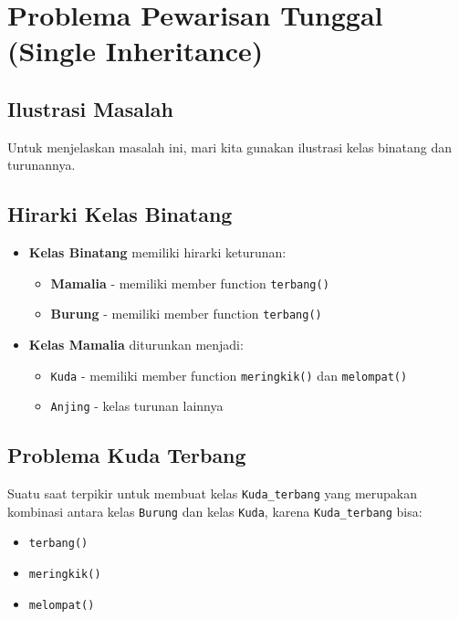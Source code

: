 \section{Problema Pewarisan Tunggal (Single Inheritance)}\label{problema-pewarisan-tunggal-single-inheritance}

\subsection{Ilustrasi Masalah}

Untuk menjelaskan masalah ini, mari kita gunakan ilustrasi kelas binatang dan turunannya.

\subsection{Hirarki Kelas Binatang}

\begin{itemize}
\item \textbf{Kelas Binatang} memiliki hirarki keturunan:
 \begin{itemize}
 \item \textbf{Mamalia} - memiliki member function \texttt{terbang()}
 \item \textbf{Burung} - memiliki member function \texttt{terbang()}
 \end{itemize}
\item \textbf{Kelas Mamalia} diturunkan menjadi:
 \begin{itemize}
 \item \texttt{Kuda} - memiliki member function \texttt{meringkik()} dan \texttt{melompat()}
 \item \texttt{Anjing} - kelas turunan lainnya
 \end{itemize}
\end{itemize}

\subsection{Problema Kuda Terbang}

Suatu saat terpikir untuk membuat kelas \texttt{Kuda\_terbang} yang merupakan kombinasi antara kelas \texttt{Burung} dan kelas \texttt{Kuda}, karena \texttt{Kuda\_terbang} bisa:
\begin{itemize}
\item \texttt{terbang()}
\item \texttt{meringkik()}
\item \texttt{melompat()}
\end{itemize}

